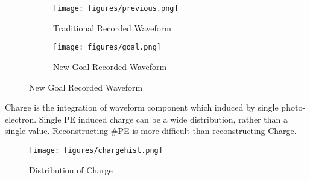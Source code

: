 \begin{figure}[H]
\begin{minipage}{.5\textwidth}
\begin{figure}[H]
    \centering
    \caption{Traditional Recorded Waveform}
    \texttt{[image: figures/previous.png]}
    \label{fig:tradi}
\end{figure}
\end{minipage}
\begin{minipage}{.5\textwidth}
\begin{figure}[H]
    \centering
    \caption{New Goal Recorded Waveform}
    \texttt{[image: figures/goal.png]}
    \label{fig:new}
\end{figure}
\end{minipage}
\end{figure}

Charge is the integration of waveform component which induced by single photo-electron. Single PE induced charge can be a wide distribution, rather than a single value. Reconstructing \#PE is more difficult than reconstructing Charge. 

\begin{figure}[H]
    \centering
    \caption{Distribution of Charge}
    \texttt{[image: figures/chargehist.png]}
    \label{fig:charge}
\end{figure}

